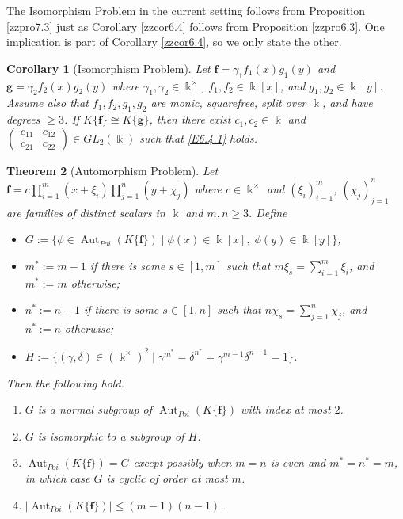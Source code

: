 \documentclass[12pt]{amsart}
\theoremstyle{plain}
\newtheorem{theorem}{Theorem}
\newtheorem{corollary}[theorem]{Corollary}
\numberwithin{theorem}{section}
\numberwithin{equation}{theorem}
\theoremstyle{definition}
\DeclareMathOperator{\Aut}{Aut}
\newcommand \bff {{\mathbf{f}}}
\newcommand \bfg {{\mathbf{g}}}
\newcommand \kx {\Bbbk^\times}
\begin{document}
The Isomorphism Problem in the current setting follows from Proposition \ref{zzpro7.3} just as Corollary \ref{zzcor6.4} follows from Proposition \ref{zzpro6.3}.  One implication is part of Corollary \ref{zzcor6.4}, so we only state the other.

\begin{corollary}[Isomorphism Problem]  \label{zzcor7.4} 
Let $\bff = \gamma_1f_1(x)g_1(y)$ and $\bfg = \gamma_2 f_2(x)g_2(y)$ where $\gamma_1,\gamma_2 \in \kx$, $f_1,f_2 \in \Bbbk[x]$, and $g_1,g_2 \in \Bbbk[y]$.  Assume also that $f_1,f_2,g_1,g_2$ are monic, squarefree, split over $\Bbbk$, and have degrees $\ge3$.
 If $K\{\bff\} \cong K\{\bfg\}$, then there exist $c_1,c_2 \in \Bbbk$ and $\begin{pmatrix} c_{11}&c_{12}\\  c_{21}&c_{22}\end{pmatrix} \in GL_2(\Bbbk)$ such that \eqref{E6.4.1} holds.
\end{corollary}


\begin{theorem}[Automorphism Problem]  \label{zzthm7.5} 
Let  $\bff = c\prod_{i=1}^m (x+\xi_i) \prod_{j=1}^{n} (y+\chi_j)$
where $c \in \kx$ and $(\xi_i)_{i=1}^{m}$, $(\chi_j)_{j=1}^n$ 
are families of distinct scalars in $\Bbbk$ and $m,n \ge 3$.  Define
\begin{itemize}
\item 
$G := \{ \phi \in \Aut_{Poi}(K\{\bff\}) \mid \phi(x) \in \Bbbk[x],\; \phi(y) \in \Bbbk[y] \}$;
\item 
$m^* := m-1$ if there is some $s \in [1,m]$ such that $m \xi_s = \sum_{i=1}^m \xi_i$, and $m^* := m$ otherwise;
\item 
$n^* := n-1$ if there is some $s \in [1,n]$ such that $n \chi_s = \sum_{j=1}^n \chi_j$, and $n^* := n$ otherwise;
\item 
$H := \{ (\gamma,\delta) \in (\kx)^2 \mid \gamma^{m^*} = \delta^{n^*} = \gamma^{m-1} \delta^{n-1} = 1 \}$.
\end{itemize}
Then the following hold.
\begin{enumerate}
\item[(1)] 
$G$ is a normal subgroup of $\Aut_{Poi}(K\{\bff\})$ with index at most $2$.
\item[(2)]
$G$ is isomorphic to a subgroup of $H$.
\item[(3)]
$\Aut_{Poi}(K\{\bff\}) = G$ except possibly when $m=n$ is even and $m^* = n^* = m$, in which case $G$ is cyclic of order at most $m$.
\item[(4)]
$|{\Aut_{Poi}}(K\{\bff\})| \le (m-1)(n-1)$.
\end{enumerate}
\end{theorem}
\end{document}
